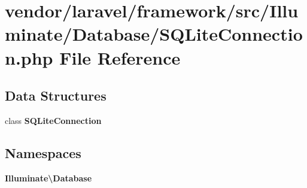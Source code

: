 \section{vendor/laravel/framework/src/\+Illuminate/\+Database/\+S\+Q\+Lite\+Connection.php File Reference}
\label{_s_q_lite_connection_8php}
\subsection*{Data Structures}
\begin{DoxyCompactItemize}
\item 
class {\bf S\+Q\+Lite\+Connection}
\end{DoxyCompactItemize}
\subsection*{Namespaces}
\begin{DoxyCompactItemize}
\item 
 {\bf Illuminate\textbackslash{}\+Database}
\end{DoxyCompactItemize}
